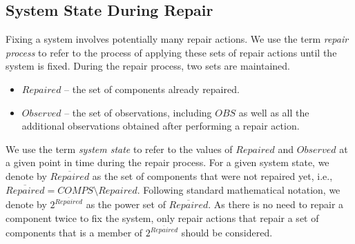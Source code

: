 \subsection{System State During Repair}
Fixing a system involves potentially many repair actions. We use the term {\em repair process} to refer to the process of applying these sets of repair actions until the system is fixed. During the repair process, two sets are maintained.
\begin{itemize}
	\item $Repaired$ -- the set of components already repaired.
	\item $Observed$ -- the set of observations, including $OBS$ as well as all the additional observations obtained after performing a repair action.
\end{itemize}
We use the term {\em system state} to refer to the values of $Repaired$ and $Observed$ at a given point in time during the repair process. For a given system state, we denote by $\overline{Repaired}$ as the set of components that were not repaired yet, i.e., $\overline{Repaired}=COMPS\setminus Repaired$.
Following standard mathematical notation, we denote by $2^{\overline{Repaired}}$ as the power set of $\overline{Repaired}$. 
As there is no need to repair a component twice to fix the system, only repair actions that repair a set of components that is a member of $2^{\overline{Repaired}}$ should be considered.





